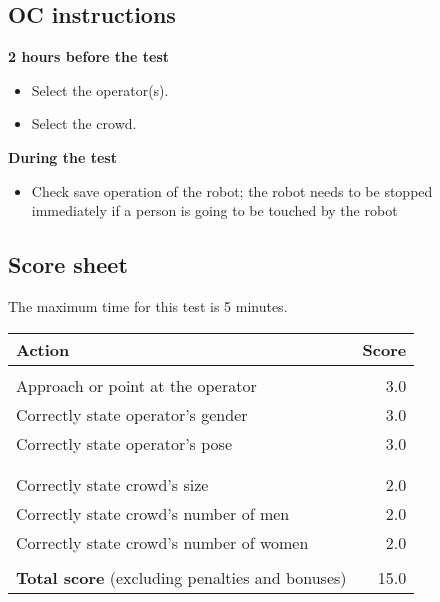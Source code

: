 %

\subsection{OC instructions}

\textbf{2 hours before the test}
\begin{itemize}
\item Select the  operator(s).
\item Select the crowd.
\end{itemize}

\textbf{During the test}
\begin{itemize}
\item Check save operation of the robot; the robot needs to be stopped immediately if a person is going to be touched by the robot
\end{itemize}

\subsection{Score sheet}
The maximum time for this test is 5 minutes.

\begin{tabularx}{\textwidth}{ X r }
	\textbf{Action} & \textbf{Score} \\ \hline
	\textbi{Operator}  \\
	Approach or point at the operator & 3.0 \\
	Correctly state operator's gender & 3.0 \\
	Correctly state operator's pose & 3.0 \\
	\\
	\textbi{Crowd} \\
	Correctly state crowd's size & 2.0 \\
	Correctly state crowd's number of men & 2.0 \\
	Correctly state crowd's number of women & 2.0 \\
	\\ \hline
	\textbf{Total score} (excluding penalties and bonuses) & 15.0 \\
\end{tabularx}
